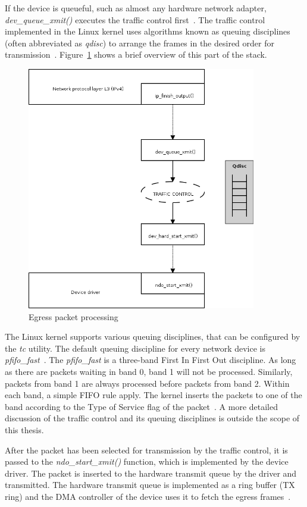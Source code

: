 If the device is queueful, such as almost any hardware network adapter, {\it{dev\_queue\_xmit()}}
executes the traffic control first~\cite{understanding-internals}.
The traffic control implemented in the Linux kernel uses algorithms known as queuing disciplines
(often abbreviated as {\it{qdisc}})
to arrange the frames in the desired order for transmission~\cite{understanding-internals}.
Figure~\ref{fig:linux-egress-packet} shows a brief overview of this part of the stack.
\begin{figure}
	\centering
	\includegraphics[width=10cm,keepaspectratio]{fig/kernel-layer2-flow.png}
	\caption{Egress packet processing}
	\label{fig:linux-egress-packet}
	\bigskip
\end{figure}

The Linux kernel supports various queuing disciplines, that can be configured by the {\it{tc}} utility.
The default queuing discipline for every network device is {\it{pfifo\_fast}}~\cite{linux-kernel-networking}.
The {\it{pfifo\_fast}} is a three-band First In First Out discipline.
As long as there are packets waiting in band 0, band 1 will not be processed.
Similarly, packets from band 1 are always processed before packets from band 2.
Within each band, a simple FIFO rule apply.
The kernel inserts the packets to one of the band according to the Type of Service flag of the packet~\cite{tcpip-in-linux}.
A more detailed discussion of the traffic control and its queuing disciplines is outside the scope of this thesis.

After the packet has been selected for transmission by the traffic control, it is passed to the
{\it{ndo\_start\_xmit()}} function, which is implemented by the device driver.
The packet is inserted to the hardware transmit queue by the driver and transmitted.
The hardware transmit queue is implemented as a ring buffer (TX ring)
and the DMA controller of the device uses it to fetch the egress frames~\cite{kernel-source}.

